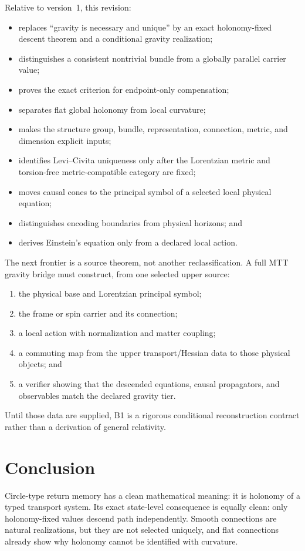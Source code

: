 \documentclass[11pt]{article}
\begin{document}
Relative to version~1, this revision:
\begin{itemize}
\item replaces ``gravity is necessary and unique'' by an exact
holonomy-fixed descent theorem and a conditional gravity realization;
\item distinguishes a consistent nontrivial bundle from a globally parallel
carrier value;
\item proves the exact criterion for endpoint-only compensation;
\item separates flat global holonomy from local curvature;
\item makes the structure group, bundle, representation, connection, metric,
and dimension explicit inputs;
\item identifies Levi--Civita uniqueness only after the Lorentzian metric and
torsion-free metric-compatible category are fixed;
\item moves causal cones to the principal symbol of a selected local physical
equation;
\item distinguishes encoding boundaries from physical horizons; and
\item derives Einstein's equation only from a declared local action.
\end{itemize}

The next frontier is a source theorem, not another reclassification.  A full
MTT gravity bridge must construct, from one selected upper source:
\begin{enumerate}
\item the physical base and Lorentzian principal symbol;
\item the frame or spin carrier and its connection;
\item a local action with normalization and matter coupling;
\item a commuting map from the upper transport/Hessian data to those physical
objects; and
\item a verifier showing that the descended equations, causal propagators,
and observables match the declared gravity tier.
\end{enumerate}
Until those data are supplied, B1 is a rigorous conditional reconstruction
contract rather than a derivation of general relativity.

\section{Conclusion}

Circle-type return memory has a clean mathematical meaning: it is holonomy of
a typed transport system.  Its exact state-level consequence is equally
clean: only holonomy-fixed values descend path independently.  Smooth
connections are natural realizations, but they are not selected uniquely, and
flat connections already show why holonomy cannot be identified with
curvature.
\end{document}
